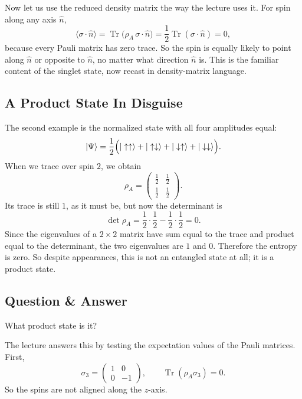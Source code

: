 Now let us use the reduced density matrix the way the lecture uses it. For spin along any axis \(\hat n\),
\begin{equation}
\langle \sigma\cdot \hat n\rangle
=
\operatorname{Tr}\bigl(\rho_A\,\sigma\cdot \hat n\bigr)
=
\frac{1}{2}\operatorname{Tr}(\sigma\cdot \hat n)
=
0,
\end{equation}
because every Pauli matrix has zero trace. So the spin is equally likely to point along \(\hat n\) or opposite to \(\hat n\), no matter what direction \(\hat n\) is. This is the familiar content of the singlet state, now recast in density-matrix language.

\subsection{A Product State In Disguise}

The second example is the normalized state with all four amplitudes equal:
\begin{equation}
|\Psi\rangle
=
\frac{1}{2}
\Bigl(
|\uparrow\uparrow\rangle
+
|\uparrow\downarrow\rangle
+
|\downarrow\uparrow\rangle
+
|\downarrow\downarrow\rangle
\Bigr).
\end{equation}
When we trace over spin \(2\), we obtain
\begin{equation}
\rho_A
=
\begin{pmatrix}
\frac{1}{2} & \frac{1}{2} \\[4pt]
\frac{1}{2} & \frac{1}{2}
\end{pmatrix}.
\end{equation}
Its trace is still \(1\), as it must be, but now the determinant is
\begin{equation}
\det \rho_A
=
\frac{1}{2}\cdot\frac{1}{2}
-
\frac{1}{2}\cdot\frac{1}{2}
=
0.
\end{equation}
Since the eigenvalues of a \(2\times2\) matrix have sum equal to the trace and product equal to the determinant, the two eigenvalues are \(1\) and \(0\). Therefore the entropy is zero. So despite appearances, this is not an entangled state at all; it is a product state.

\subsection{Question \& Answer}

What product state is it?

The lecture answers this by testing the expectation values of the Pauli matrices. First,
\begin{equation}
\sigma_3
=
\begin{pmatrix}
1 & 0 \\[4pt]
0 & -1
\end{pmatrix},
\qquad
\operatorname{Tr}(\rho_A \sigma_3)=0.
\end{equation}
So the spins are not aligned along the \(z\)-axis.


